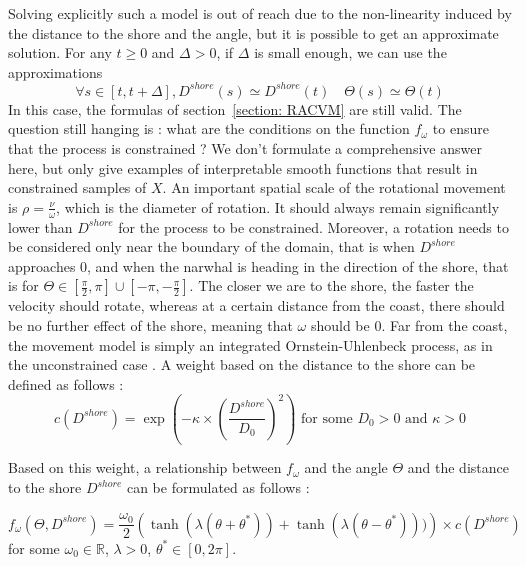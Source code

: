\documentclass[11pt]{article}
\newcommand {\R}{\mathbb{R}}
\newcommand {\1}{\mathbb{1}}
\begin{document}
Solving explicitly such a model is out of reach due to the non-linearity induced by the distance to the shore and the angle, but it is possible to get an approximate solution.
For any $t \geq 0$ and $\Delta>0$, if $\Delta$ is small enough, we can use the approximations
\[\forall s \in [t,t+\Delta], D^{shore}(s) \simeq D^{shore}(t) \quad \Theta(s)\simeq \Theta(t)\]
In this case, the formulas of section~\ref{section: RACVM} are still valid.
The question still hanging is : what are the conditions on the function $f_{\omega}$ to ensure that the process is constrained ?
We don't formulate a comprehensive answer here, but only give examples of interpretable smooth functions that result in constrained samples of $X$.
An important spatial scale of the rotational movement is $\rho=\frac{\nu}{\omega}$, which is the diameter of rotation. It should always remain significantly lower than $D^{shore}$ for the process to be constrained. Moreover, a rotation needs to be considered only near the boundary of the domain, that is when $D^{shore}$ approaches $0$, and when the narwhal is heading in the direction of the shore, that is for $\Theta \in \left[\frac{\pi}{2},\pi\right] \cup \left[-\pi,-\frac{\pi}{2}\right]$.
The closer we are to the shore, the faster the velocity should rotate,
whereas at a certain distance from the coast, there should be no further effect of the shore, meaning that $\omega$ should be $0$. Far from the coast, the movement model is simply an integrated Ornstein-Uhlenbeck process, as in the unconstrained case \cite{johnson_continuoustime_2008}.
A weight based on the distance to the shore can be defined as follows :
\[c(D^{shore})=\exp\left(-\kappa \times \left(\frac{D^{shore}}{D_0}\right)^2\right)\mbox{ for some } D_0>0 \mbox{ and } \kappa>0\]

Based on this weight, a relationship between $f_{\omega}$ and the angle $\Theta$ and the distance to the shore $D^{shore}$ can be formulated as follows :

\begin{equation}
f_{\omega}(\Theta,D^{shore})=\frac{\omega_0}{2}\left(\tanh(\lambda(\theta+\theta^{*}))+\tanh(\lambda(\theta-\theta^{*})))\right)\times c(D^{shore})
\label{eq: smooth omega}
\end{equation}
for some $\omega_0 \in \R$, $\lambda>0$, $\theta^* \in [0,2\pi]$.
\end{document}

